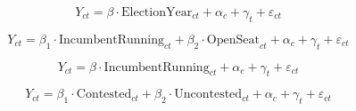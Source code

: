 
\begin{equation}\tag{T0}
Y_{ct} = \beta \cdot \text{ElectionYear}_{ct} + \alpha_c + \gamma_t + \varepsilon_{ct}
\end{equation}


\begin{equation}\tag{T1}
Y_{ct} = \beta_1 \cdot \text{IncumbentRunning}_{ct} + \beta_2 \cdot \text{OpenSeat}_{ct} + \alpha_c + \gamma_t + \varepsilon_{ct}
\end{equation}


\begin{equation}\tag{T5}
Y_{ct} = \beta \cdot \text{IncumbentRunning}_{ct} + \alpha_c + \gamma_t + \varepsilon_{ct}
\end{equation}


\begin{equation}\tag{T2}
Y_{ct} = \beta_1 \cdot \text{Contested}_{ct} + \beta_2 \cdot \text{Uncontested}_{ct} + \alpha_c + \gamma_t + \varepsilon_{ct}
\end{equation}




